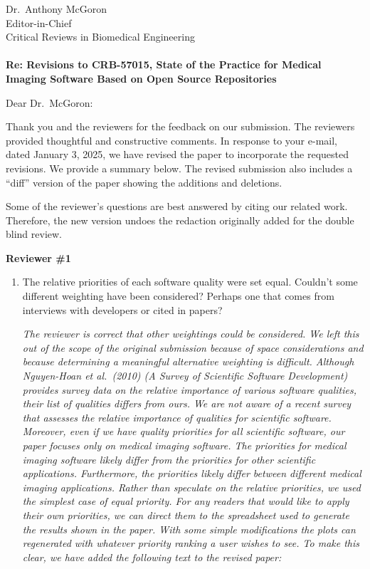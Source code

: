 \documentclass[12pt]{casletter}
\begin{document}
\begin{letter}{~\\
    ~\\
    ~\\
    ~\\
    ~\\
    Dr.\ Anthony McGoron\\
    Editor-in-Chief\\
    Critical Reviews in Biomedical Engineering\\
    ~\\
    {\bf Re: Revisions to CRB-57015, State of the Practice for Medical Imaging
    Software Based on Open Source Repositories}}

  \opening {Dear Dr.\ McGoron:}

  Thank you and the reviewers for the feedback on our submission.  The reviewers
  provided thoughtful and constructive comments.  In response to your e-mail,
  dated January 3, 2025, we have revised the paper to incorporate the requested
  revisions.  We provide a summary below.  The revised submission also includes
  a ``diff'' version of the paper showing the additions and deletions.

  Some of the reviewer's questions are best answered by citing our related work.
  Therefore, the new version undoes the redaction originally added for the
  double blind review.

  \textbf{Reviewer \#1}

  \begin{enumerate}
  \item The relative priorities of each software quality were set equal.
  Couldn't some different weighting have been considered? Perhaps one that comes
  from interviews with developers or cited in papers? \medskip

  \emph{The reviewer is correct that other weightings could be considered.  We
  left this out of the scope of the original submission because of space
  considerations and because determining a meaningful alternative weighting is
  difficult.  Although Nguyen-Hoan et al.\ (2010) (A Survey of Scientific
  Software Development) provides survey data on the relative importance of
  various software qualities, their list of qualities differs from ours.  We are
  not aware of a recent survey that assesses the relative importance of
  qualities for scientific software. Moreover, even if we have quality
  priorities for all scientific software, our paper focuses only on medical
  imaging software.  The priorities for medical imaging software likely differ
  from the priorities for other scientific applications.  Furthermore, the
  priorities likely differ between different medical imaging applications.
  Rather than speculate on the relative priorities, we used the simplest case of
  equal priority. For any readers that would like to apply their own priorities,
  we can direct them to the spreadsheet used to generate the results shown in the
  paper.  With some simple modifications the plots can regenerated with whatever
  priority ranking a user wishes to see.  To make this clear, we have added the
  following text to the revised paper:  } \smallskip
  

\end{enumerate}
\end{letter}
\end{document}

